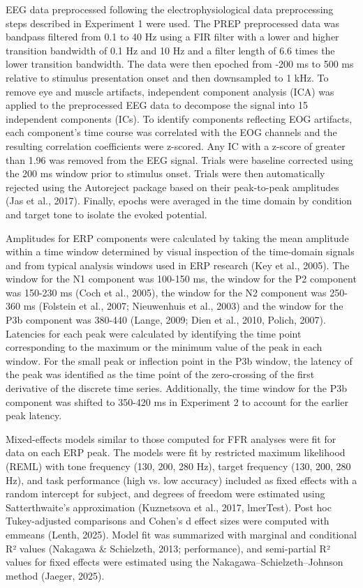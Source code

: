 \documentclass{article}
\begin{document}
EEG data preprocessed following the electrophysiological data preprocessing steps described in Experiment 1 were used. The PREP preprocessed data was bandpass filtered from 0.1 to 40 Hz using a FIR filter with a lower and higher transition bandwidth of 0.1 Hz and 10 Hz and a filter length of 6.6 times the lower transition bandwidth. The data were then epoched from -200 ms to 500 ms relative to stimulus presentation onset and then downsampled to 1 kHz. To remove eye and muscle artifacts, independent component analysis (ICA) was applied to the preprocessed EEG data to decompose the signal into 15 independent components (ICs). To identify components reflecting EOG artifacts, each component’s time course was correlated with the EOG channels and the resulting correlation coefficients were z-scored. Any IC with a z-score of greater than 1.96 was removed from the EEG signal. Trials were baseline corrected using the 200 ms window prior to stimulus onset. Trials were then automatically rejected using the Autoreject package based on their peak-to-peak amplitudes (Jas et al., 2017). Finally, epochs were averaged in the time domain by condition and target tone to isolate the evoked potential.

Amplitudes for ERP components were calculated by taking the mean amplitude within a time window determined by visual inspection of the time-domain signals and from typical analysis windows used in ERP research (Key et al., 2005). The window for the N1 component was 100-150 ms, the window for the P2 component was 150-230 ms (Coch et al., 2005), the window for the N2 component was 250-360 ms (Folstein et al., 2007; Nieuwenhuis et al., 2003) and the window for the P3b component was 380-440 (Lange, 2009; Dien et al., 2010, Polich, 2007). Latencies for each peak were calculated by identifying the time point corresponding to the maximum or the minimum value of the peak in each window. For the small peak or inflection point in the P3b window, the latency of the peak was identified as the time point of the zero-crossing of the first derivative of the discrete time series. Additionally, the time window for the P3b component was shifted to 350-420 ms in Experiment 2 to account for the earlier peak latency.

Mixed-effects models similar to those computed for FFR analyses were fit for data on each ERP peak. The models were fit by restricted maximum likelihood (REML) with tone frequency (130, 200, 280 Hz), target frequency (130, 200, 280 Hz), and task performance (high vs. low accuracy) included as fixed effects with a random intercept for subject, and degrees of freedom were estimated using Satterthwaite’s approximation (Kuznetsova et al., 2017, lmerTest). Post hoc Tukey-adjusted comparisons and Cohen’s d effect sizes were computed with emmeans (Lenth, 2025). Model fit was summarized with marginal and conditional R² values (Nakagawa \& Schielzeth, 2013; performance), and semi-partial R² values for fixed effects were estimated using the Nakagawa–Schielzeth–Johnson method (Jaeger, 2025).
\end{document}
